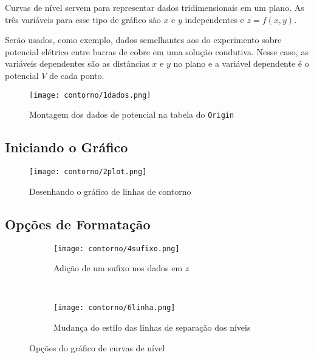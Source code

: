 Curvas de nível servem para representar dados tridimensionais em um plano. As três variáveis para esse tipo de gráfico são $x$ e $y$ independentes e $z = f(x,y)$.

Serão usados, como exemplo, dados semelhantes aos do experimento sobre potencial elétrico entre barras de cobre em uma solução condutiva. Nesse caso, as variáveis dependentes são as distâncias $x$ e $y$ no plano e a variável dependente é o potencial $V$ de cada ponto.

\begin{figure}[htbp]
    \centering
    \texttt{[image: contorno/1dados.png]}

    \caption{Montagem dos dados de potencial na tabela do \texttt{Origin}}
    \label{fig:contorno:dados}
\end{figure}


\subsection{Iniciando o Gráfico}

    \begin{figure}[htbp]
        \centering
        \texttt{[image: contorno/2plot.png]}

        \caption{Desenhando o gráfico de linhas de contorno}
        \label{fig:contorno:plot}
    \end{figure}

\subsection{Opções de Formatação}

    \begin{figure}[H]
        \centering
        \begin{subfigure}{0.7\textwidth}
            \centering
            \texttt{[image: contorno/4sufixo.png]}

            \caption{Adição de um sufixo nos dados em $z$}
            \label{fig:contorno:sufixo}
        \end{subfigure}
        ~
        \begin{subfigure}{0.7\textwidth}
            \centering
            \texttt{[image: contorno/6linha.png]}

            \caption{Mudança do estilo das linhas de separação dos níveis}
            \label{fig:contorno:linhas}
        \end{subfigure}
        \caption{Opções do gráfico de curvas de nível}
        \label{fig:contorno:opcoes}
    \end{figure}

